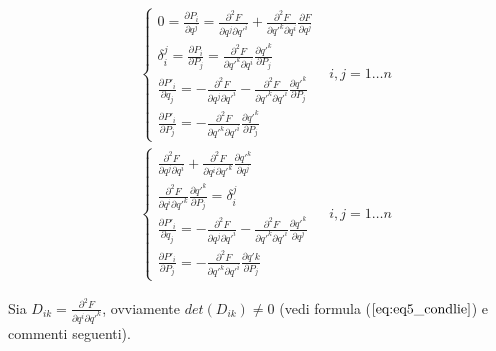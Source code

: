 \begin{align*}
& \begin{cases}
0 = \frac{\partial P_i}{\partial q^j} = \frac{\partial^2 F}{\partial q^j \partial q'^i} + \frac{\partial^2 F}{\partial q'^k \partial q^i} \frac{\partial F}{\partial q^j}
\\
\delta_i^j = \frac{\partial P_i}{\partial P_j} = \frac{\partial^2 F}{\partial q'^k \partial q^i} \frac{\partial q'^k}{\partial P_j}
\\
\frac{\partial P'_i}{\partial q_j} = - \frac{\partial^2 F}{\partial q^j \partial q'^i} - \frac{\partial^2 F}{\partial q'^k \partial q'^i} \frac{\partial q'^k}{\partial P_j}
\\
\frac{\partial P'_i}{\partial P_j} = - \frac{\partial^2 F}{\partial q'^k \partial q'^i} \frac{\partial q'^k}{\partial P_j}
\end{cases} & i, j = 1 \dots n
\\
& \begin{cases}
\frac{\partial^2 F}{\partial q^j \partial q^i} + \frac{\partial^2 F}{\partial q^i \partial q'^k} \frac{\partial q'^k}{\partial q^j}
\\
\frac{\partial^2 F}{\partial q^i \partial q'^k} \frac{\partial q'^k}{\partial P_j} = \delta_i^j
\\
\frac{\partial P'_i}{\partial q_j} = - \frac{\partial^2 F}{\partial q^j \partial q'^i} - \frac{\partial^2 F}{\partial q'^k \partial q'^i} \frac{\partial q'^k}{\partial q^j}
\\
\frac{\partial P'_i}{\partial P_j} = - \frac{\partial^2 F}{\partial q'^k \partial q'^i} \frac{\partial q'k}{\partial P_j}
\end{cases} & i, j = 1 \dots n
\end{align*}

Sia $ D_{ik} = \frac{\partial^2 F}{\partial q^i \partial q'^k} $, ovviamente $ det (D_{ik}) \neq 0 $ (vedi formula ($ \ref{eq:eq5_condlie} $) e commenti seguenti).


